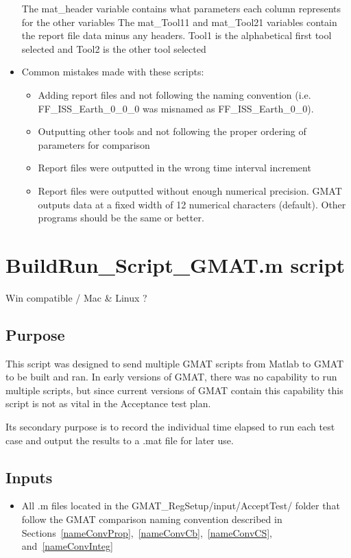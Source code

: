 \begin{itemize}
  The mat\_header variable contains what parameters each column
  represents for the other variables The mat\_Tool11 and mat\_Tool21
  variables contain the report file data minus any headers. Tool1 is
  the alphabetical first tool selected and Tool2 is the other tool
  selected
  \item Common mistakes made with these scripts:
    \begin{itemize}
        \item Adding report files and not following the naming convention
        (i.e. FF\_ISS\_Earth\_0\_0\_0 was misnamed as FF\_ISS\_Earth\_0\_0).
        \item Outputting other tools and not following the proper ordering of
        parameters for comparison
        \item Report files were outputted in the
        wrong time interval increment
        \item  Report files were outputted without enough numerical precision.
        GMAT outputs data at a fixed width of 12 numerical characters (default).
        Other programs should be the same or better.
    \end{itemize}
\end{itemize}

\section{BuildRun\_Script\_GMAT.m script}
Win compatible / Mac \& Linux ? \\
\subsection{Purpose}
This script was designed to send multiple GMAT scripts from Matlab
to GMAT to be built and ran. In early versions of GMAT, there was no
capability to run multiple scripts, but since current versions of
GMAT contain this capability this script is not as vital in the
Acceptance test plan.

Its secondary purpose is to record the individual time elapsed to
run each test case and output the results to a .mat file for later
use.
\subsection{Inputs}
\begin{itemize}
    \item All .m files located in the GMAT\_RegSetup/input/AcceptTest/ folder that follow the
    GMAT comparison naming convention described in
    Sections~\ref{nameConvProp},~\ref{nameConvCb},~\ref{nameConvCS},
    and~\ref{nameConvInteg}
\end{itemize}

